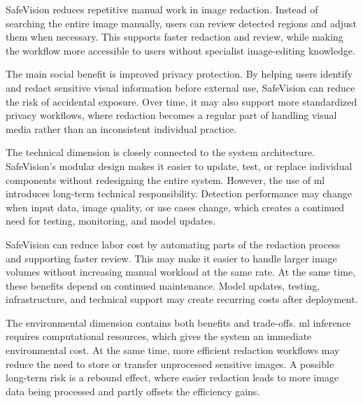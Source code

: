 
\gls{SafeVision} reduces repetitive manual work in image redaction. Instead of searching the entire image manually, users can review detected regions and adjust them when necessary. This supports faster redaction and review, while making the workflow more accessible to users without specialist image-editing knowledge.


The main social benefit is improved privacy protection. By helping users identify and redact sensitive visual information before external use, \gls{SafeVision} can reduce the risk of accidental exposure. Over time, it may also support more standardized privacy workflows, where redaction becomes a regular part of handling visual media rather than an inconsistent individual practice.


The technical dimension is closely connected to the system architecture. \gls{SafeVision}'s modular design makes it easier to update, test, or replace individual components without redesigning the entire system. However, the use of \acrshort{ml} introduces long-term technical responsibility. Detection performance may change when input data, image quality, or use cases change, which creates a continued need for testing, monitoring, and model updates.


\gls{SafeVision} can reduce labor cost by automating parts of the redaction process and supporting faster review. This may make it easier to handle larger image volumes without increasing manual workload at the same rate. At the same time, these benefits depend on continued maintenance. Model updates, testing, infrastructure, and technical support may create recurring costs after deployment.


The environmental dimension contains both benefits and trade-offs. \acrshort{ml} \gls{inference} requires computational resources, which gives the system an immediate environmental cost. At the same time, more efficient redaction workflows may reduce the need to store or transfer unprocessed sensitive images. A possible long-term risk is a rebound effect, where easier redaction leads to more image data being processed and partly offsets the efficiency gains.


